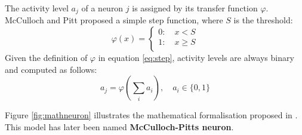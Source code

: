 \documentclass[10pt,a4paper,DIV=11]{scrreprt}
\begin{document}
The activity level $a_j$ of a neuron $j$ is assigned by its transfer function $\varphi$. McCulloch and Pitt proposed a simple step function, 
where $S$ is the threshold:\\

\begin{equation}
	\varphi(x)=\begin{cases}
		0: \quad  x < S \\
		1: \quad  x \geq S \\
	\end{cases}
\label{eq:step}
\end{equation}
Given the definition of $\varphi$ in equation \eqref{eq:step}, activity levels are always binary and computed as follows:\\

\begin{equation}
a_j = \varphi(\sum_{i}^{} a_{i}), \quad a_i \in \{0, 1\}
\end{equation}

Figure \ref{fig:mathneuron} illustrates the mathematical formalisation proposed in \cite{NEURONMATH}. This model has later been 
named \textbf{McCulloch-Pitts neuron}. 
\end{document}
